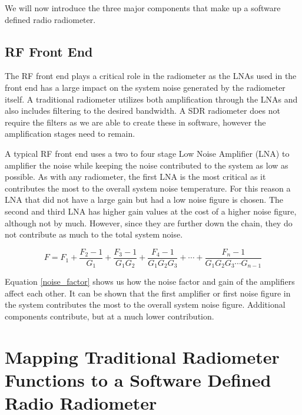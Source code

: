 We will now introduce the three major components that make up a software defined radio radiometer. 

\subsection{RF Front End}
The RF front end plays a critical role in the radiometer as the LNAs used in the front end has a large impact on the system noise generated by the radiometer itself.  A traditional radiometer utilizes both amplification through the LNAs and also includes filtering to the desired bandwidth.  A SDR radiometer does not require the filters as we are able to create these in software, however the amplification stages need to remain.  


A typical RF front end uses a two to four stage Low Noise Amplifier (LNA) to amplifier the noise while keeping the noise contributed to the system as low as possible.  As with any radiometer, the first LNA is the most critical as it contributes the most to the overall system noise temperature.  For this reason a LNA that did not have a large gain but had a low noise figure is chosen. The second and third LNA has higher gain values at the cost of a higher noise figure, although not by much.  However, since they are further down the chain, they do not contribute as much to the total system noise.  

\begin{equation}\label{noise_factor}
F=F_1+\frac{F_2-1}{G_1}+\frac{F_3-1}{G_1 G_2}+\frac{F_4-1}{G_1 G_2 G_3}+\cdots +\frac{F_n-1}{G_1 G_2 G_3 \cdots G_{n-1}}
\end{equation}

Equation \ref{noise_factor} shows us how the noise factor and gain of the amplifiers affect each other.  It can be shown that the first amplifier or first noise figure in the system contributes the most to the overall system noise figure.  Additional components contribute, but at a much lower contribution.

\section{Mapping Traditional Radiometer Functions to a Software Defined Radio Radiometer}

